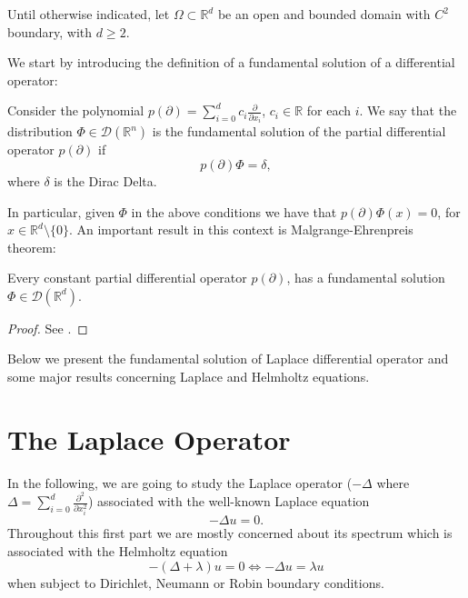 \label{chap:back}

Until otherwise indicated, let \(\Omega \subset \mathbb{R}^d\) be an open and bounded domain with \(C^2\) boundary, with $d \geq 2$.

We start by introducing the definition of a fundamental solution of a differential operator:
\begin{definition}
    Consider the polynomial $p(\partial) = \sum_{i=0}^{d} c_i \frac{\partial}{\partial x_i}$, $c_i \in \mathbb{R}$ for each $i$. We say that the distribution $\Phi \in \mathcal{D}(\mathbb{R}^n)$ is the fundamental solution of the partial differential operator $p(\partial)$ if
    \[p(\partial) \Phi = \delta,
        \]
    where $\delta$ is the Dirac Delta.
\end{definition}

In particular, given $\Phi$ in the above conditions we have that $p(\partial)\Phi(x) = 0$, for $x \in \mathbb{R}^d\setminus \{0\}$. An important result in this context is Malgrange-Ehrenpreis theorem:

\begin{theorem}\label{malgrange-ehrenpreis}
    Every constant partial differential operator $p(\partial)$, has a fundamental solution $\Phi \in \mathcal{D}(\mathbb{R}^d)$.
\end{theorem}

\begin{proof}
    See \cite{reed1975ii}.
\end{proof}
Below we present the fundamental solution of Laplace differential operator and some major results concerning Laplace and Helmholtz equations. 

\section{The Laplace Operator}
\label{section:laplace_op}

In the following, we are going to study the Laplace operator (\(-\Delta\) where $\Delta=\sum_{i=0}^{d}\frac{\partial^2 }{\partial x_i^2}$) associated with the well-known Laplace equation
\begin{equation} \label{laplace_equation}
    -\Delta u = 0.
\end{equation}
Throughout this first part we are mostly concerned about its spectrum which is associated with the Helmholtz equation
\begin{equation} \label{helmholtz_equation}
    -(\Delta+\lambda) u = 0 \iff -\Delta u = \lambda u
\end{equation}
when subject to Dirichlet, Neumann or Robin boundary conditions.

